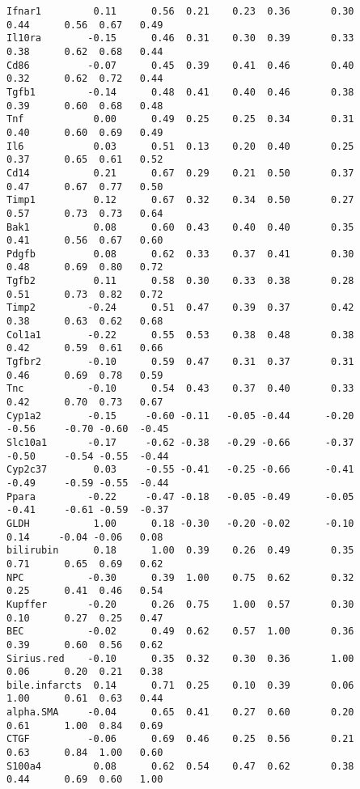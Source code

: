 \documentclass[]{article}
\begin{document}
\begin{verbatim}
Ifnar1         0.11      0.56  0.21    0.23  0.36       0.30          0.44      0.56  0.67   0.49
Il10ra        -0.15      0.46  0.31    0.30  0.39       0.33          0.38      0.62  0.68   0.44
Cd86          -0.07      0.45  0.39    0.41  0.46       0.40          0.32      0.62  0.72   0.44
Tgfb1         -0.14      0.48  0.41    0.40  0.46       0.38          0.39      0.60  0.68   0.48
Tnf            0.00      0.49  0.25    0.25  0.34       0.31          0.40      0.60  0.69   0.49
Il6            0.03      0.51  0.13    0.20  0.40       0.25          0.37      0.65  0.61   0.52
Cd14           0.21      0.67  0.29    0.21  0.50       0.37          0.47      0.67  0.77   0.50
Timp1          0.12      0.67  0.32    0.34  0.50       0.27          0.57      0.73  0.73   0.64
Bak1           0.08      0.60  0.43    0.40  0.40       0.35          0.41      0.56  0.67   0.60
Pdgfb          0.08      0.62  0.33    0.37  0.41       0.30          0.48      0.69  0.80   0.72
Tgfb2          0.11      0.58  0.30    0.33  0.38       0.28          0.51      0.73  0.82   0.72
Timp2         -0.24      0.51  0.47    0.39  0.37       0.42          0.38      0.63  0.62   0.68
Col1a1        -0.22      0.55  0.53    0.38  0.48       0.38          0.42      0.59  0.61   0.66
Tgfbr2        -0.10      0.59  0.47    0.31  0.37       0.31          0.46      0.69  0.78   0.59
Tnc           -0.10      0.54  0.43    0.37  0.40       0.33          0.42      0.70  0.73   0.67
Cyp1a2        -0.15     -0.60 -0.11   -0.05 -0.44      -0.20         -0.56     -0.70 -0.60  -0.45
Slc10a1       -0.17     -0.62 -0.38   -0.29 -0.66      -0.37         -0.50     -0.54 -0.55  -0.44
Cyp2c37        0.03     -0.55 -0.41   -0.25 -0.66      -0.41         -0.49     -0.59 -0.55  -0.44
Ppara         -0.22     -0.47 -0.18   -0.05 -0.49      -0.05         -0.41     -0.61 -0.59  -0.37
GLDH           1.00      0.18 -0.30   -0.20 -0.02      -0.10          0.14     -0.04 -0.06   0.08
bilirubin      0.18      1.00  0.39    0.26  0.49       0.35          0.71      0.65  0.69   0.62
NPC           -0.30      0.39  1.00    0.75  0.62       0.32          0.25      0.41  0.46   0.54
Kupffer       -0.20      0.26  0.75    1.00  0.57       0.30          0.10      0.27  0.25   0.47
BEC           -0.02      0.49  0.62    0.57  1.00       0.36          0.39      0.60  0.56   0.62
Sirius.red    -0.10      0.35  0.32    0.30  0.36       1.00          0.06      0.20  0.21   0.38
bile.infarcts  0.14      0.71  0.25    0.10  0.39       0.06          1.00      0.61  0.63   0.44
alpha.SMA     -0.04      0.65  0.41    0.27  0.60       0.20          0.61      1.00  0.84   0.69
CTGF          -0.06      0.69  0.46    0.25  0.56       0.21          0.63      0.84  1.00   0.60
S100a4         0.08      0.62  0.54    0.47  0.62       0.38          0.44      0.69  0.60   1.00
\end{verbatim}
\end{document}
